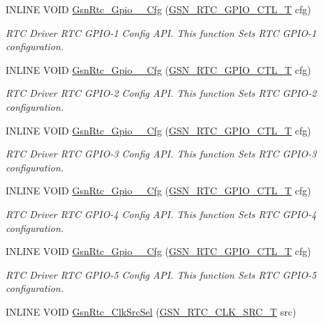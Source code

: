 \begin{DoxyCompactItemize}
INLINE VOID \hyperlink{a00651_ga2c81792265698c13ab7088ba3195e08e}{GsnRtc\_\-Gpio\_\_\-Cfg} (\hyperlink{a00651_gaac2b2cc7a6f64a96caddc19f3b3df78b}{GSN\_\-RTC\_\-GPIO\_\-CTL\_\-T} cfg)
\begin{DoxyCompactList}\small\item\em RTC Driver RTC GPIO-\/1 Config API. This function Sets RTC GPIO-\/1 configuration. \end{DoxyCompactList}\item 
INLINE VOID \hyperlink{a00651_ga7d27ee4a3acaf387ff12a497d7ae2120}{GsnRtc\_\-Gpio\_\_\-Cfg} (\hyperlink{a00651_gaac2b2cc7a6f64a96caddc19f3b3df78b}{GSN\_\-RTC\_\-GPIO\_\-CTL\_\-T} cfg)
\begin{DoxyCompactList}\small\item\em RTC Driver RTC GPIO-\/2 Config API. This function Sets RTC GPIO-\/2 configuration. \end{DoxyCompactList}\item 
INLINE VOID \hyperlink{a00651_ga3cdaf161d94738dcd5f84a2b38a52c92}{GsnRtc\_\-Gpio\_\_\-Cfg} (\hyperlink{a00651_gaac2b2cc7a6f64a96caddc19f3b3df78b}{GSN\_\-RTC\_\-GPIO\_\-CTL\_\-T} cfg)
\begin{DoxyCompactList}\small\item\em RTC Driver RTC GPIO-\/3 Config API. This function Sets RTC GPIO-\/3 configuration. \end{DoxyCompactList}\item 
INLINE VOID \hyperlink{a00651_gac809bed7d40c3c9feb0cda54de5860d2}{GsnRtc\_\-Gpio\_\_\-Cfg} (\hyperlink{a00651_gaac2b2cc7a6f64a96caddc19f3b3df78b}{GSN\_\-RTC\_\-GPIO\_\-CTL\_\-T} cfg)
\begin{DoxyCompactList}\small\item\em RTC Driver RTC GPIO-\/4 Config API. This function Sets RTC GPIO-\/4 configuration. \end{DoxyCompactList}\item 
INLINE VOID \hyperlink{a00651_ga799fcbbbd4834b39baee8d35767872d2}{GsnRtc\_\-Gpio\_\_\-Cfg} (\hyperlink{a00651_gaac2b2cc7a6f64a96caddc19f3b3df78b}{GSN\_\-RTC\_\-GPIO\_\-CTL\_\-T} cfg)
\begin{DoxyCompactList}\small\item\em RTC Driver RTC GPIO-\/5 Config API. This function Sets RTC GPIO-\/5 configuration. \end{DoxyCompactList}\item 
INLINE VOID \hyperlink{a00651_ga4a163d7eb12d94ff92451b040f3863ec}{GsnRtc\_\-ClkSrcSel} (\hyperlink{a00651_gadb97e494297aadf7b5dda5f239d96c80}{GSN\_\-RTC\_\-CLK\_\-SRC\_\-T} src)

\end{DoxyCompactItemize}
